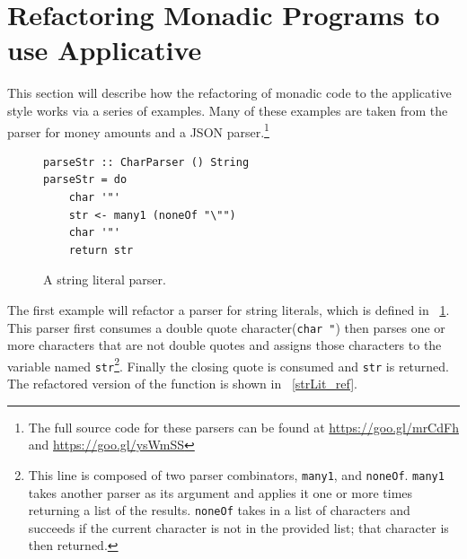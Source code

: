 
\DIFaddend \section{Refactoring Monadic Programs to use Applicative}
\label{sec:appRefact}

This section will describe how the refactoring of monadic code to the applicative style works via a series of examples. Many of these examples are taken from \DIFaddbegin {}\DIFaddend the parser for money amounts and a JSON parser.\footnote{The full source code for these parsers can be found at \url{https://goo.gl/mrCdFh} and \url{https://goo.gl/ysWmSS}} 

\begin{figure}[t]
\begin{lstlisting}
parseStr :: CharParser () String
parseStr = do
	char '"'
	str <- many1 (noneOf "\"")
	char '"'
	return str
\end{lstlisting}
\caption{A string literal parser.}
\label{strLit}
\end{figure}

The first example will refactor a parser for string literals, which is defined in \DIFdelbegin {}\DIFdelend \DIFaddbegin {}\DIFaddend ~\ref{strLit}. This parser first consumes a double quote character(\texttt{char \textquotesingle"\textquotesingle}) then parses one or more characters that are not double quotes and assigns those characters to the variable named \texttt{str}\footnote{This line is composed of two parser combinators, \texttt{many1}, and \texttt{noneOf}. \texttt{many1} takes another parser as its argument and applies it one or more times returning a list of the results. \texttt{noneOf} takes in a list of characters and succeeds if the current character is not in the provided list; that character is then returned.}. Finally the closing quote is consumed and \texttt{str} is returned. The refactored version of the function is shown in \DIFdelbegin {}\DIFdelend \DIFaddbegin {}\DIFaddend ~\ref{strLit_ref}.

